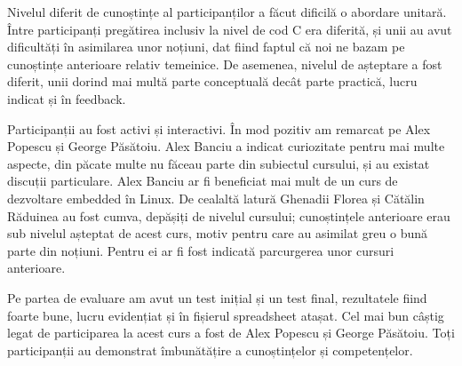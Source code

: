\documentclass[12pt]{article}
\begin{document}
Nivelul diferit de cunoștințe al participanților a făcut dificilă o abordare unitară. Între participanți pregătirea inclusiv la nivel de cod C era diferită, și unii au avut dificultăți în asimilarea unor noțiuni, dat fiind faptul că noi ne bazam pe cunoștințe anterioare relativ temeinice. De asemenea, nivelul de așteptare a fost diferit, unii dorind mai multă parte conceptuală decât parte practică, lucru indicat și în feedback.

Participanții au fost activi și interactivi. În mod pozitiv am remarcat pe Alex Popescu și George Păsătoiu. Alex Banciu a indicat curiozitate pentru mai multe aspecte, din păcate multe nu făceau parte din subiectul cursului, și au existat discuții particulare. Alex Banciu ar fi beneficiat mai mult de un curs de dezvoltare embedded în Linux. De cealaltă latură Ghenadii Florea și Cătălin Răduinea au fost cumva, depășiți de nivelul cursului; cunoștințele anterioare erau sub nivelul așteptat de acest curs, motiv pentru care au asimilat greu o bună parte din noțiuni. Pentru ei ar fi fost indicată parcurgerea unor cursuri anterioare.

Pe partea de evaluare am avut un test inițial și un test final, rezultatele fiind foarte bune, lucru evidențiat și în fișierul spreadsheet atașat. Cel mai bun câștig legat de participarea la acest curs a fost de Alex Popescu și George Păsătoiu. Toți participanții au demonstrat îmbunătățire a cunoștințelor și competențelor.
\end{document}

